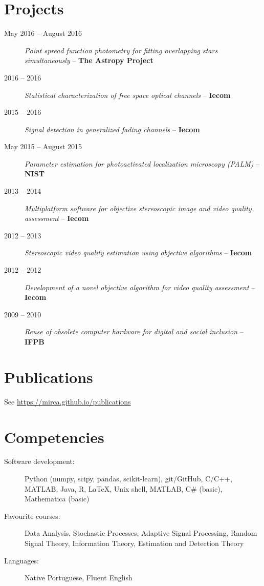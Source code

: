 \documentclass[10pt]{article}
\begin{document}
\begin{titlepage}
\section{Projects}
\begin{description}
\item[May 2016 -- August 2016] \emph{Point spread function photometry for fitting overlapping stars simultaneously} -- \textbf{The Astropy Project}
\item[2016 -- 2016] \emph{Statistical characterization of free space optical channels} -- \textbf{Iecom}
\item[2015 -- 2016] \emph{Signal detection in generalized fading channels} -- \textbf{Iecom}
\item[May 2015 -- August 2015] \emph{Parameter estimation for photoactivated localization microscopy (PALM)} -- \textbf{NIST}
\item[2013 -- 2014] \emph{Multiplatform software for objective stereoscopic image and video quality assessment} -- \textbf{Iecom}
\item[2012 -- 2013] \emph{Stereoscopic video quality estimation using objective algorithms} -- \textbf{Iecom}
\item[2012 -- 2012] \emph{Development of a novel objective algorithm for video quality assessment} -- \textbf{Iecom}
\item[2009 -- 2010] \emph{Reuse of obsolete computer hardware for digital and social inclusion} -- \textbf{IFPB}
\end{description}

\section{Publications}
See \url{https://mirca.github.io/publications}

\section{Competencies}
\begin{description}
    \item[Software development:] Python (numpy, scipy, pandas, scikit-learn), git/GitHub, C/C++, MATLAB, Java, R, LaTeX, Unix shell, MATLAB, C\# (basic), Mathematica (basic)
    \item[Favourite courses:]  Data Analysis, Stochastic Processes, Adaptive Signal Processing, Random Signal Theory, Information Theory, Estimation and Detection Theory
    \item[Languages:] Native Portuguese, Fluent English
\end{description}


\end{titlepage}
\end{document}
